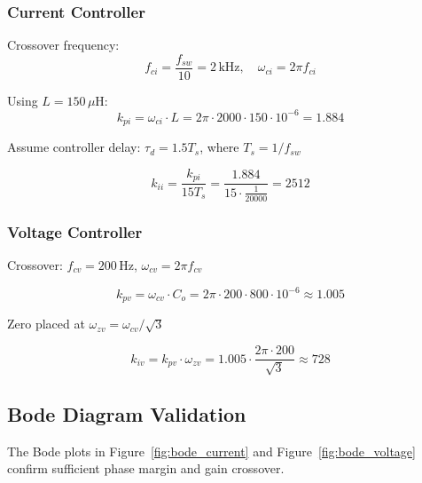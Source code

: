 \subsubsection{Current Controller}

Crossover frequency:
\begin{equation}
f_{ci} = \frac{f_{sw}}{10} = 2\,\mathrm{kHz}, \quad \omega_{ci} = 2\pi f_{ci}
\end{equation}

Using $L = 150\,\mu\mathrm{H}$:
\begin{equation}
k_{pi} = \omega_{ci} \cdot L = 2\pi \cdot 2000 \cdot 150\cdot10^{-6} = 1.884
\end{equation}

Assume controller delay: $\tau_d = 1.5 T_s$, where $T_s = 1/f_{sw}$

\begin{equation}
k_{ii} = \frac{k_{pi}}{15 T_s} = \frac{1.884}{15 \cdot \frac{1}{20000}} = 2512
\end{equation}

\subsubsection{Voltage Controller}

Crossover: $f_{cv} = 200\,\mathrm{Hz}$, $\omega_{cv} = 2\pi f_{cv}$

\begin{equation}
k_{pv} = \omega_{cv} \cdot C_o = 2\pi \cdot 200 \cdot 800\cdot10^{-6} \approx 1.005
\end{equation}

Zero placed at $\omega_{zv} = \omega_{cv}/\sqrt{3}$

\begin{equation}
k_{iv} = k_{pv} \cdot \omega_{zv} = 1.005 \cdot \frac{2\pi \cdot 200}{\sqrt{3}} \approx 728
\end{equation}

\subsection{Bode Diagram Validation}

The Bode plots in Figure~\ref{fig:bode_current} and Figure~\ref{fig:bode_voltage} confirm sufficient phase margin and gain crossover.

